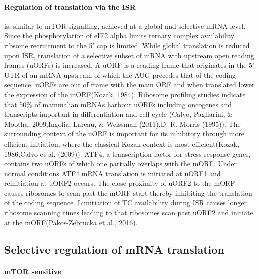 \documentclass[12pt,openany]{book}
\begin{document}
\paragraph{Regulation of translation via the ISR} is, similar to mTOR
signalling, achieved at a global and selective mRNA level. Since the
phosphorylation of eIF2 alpha limits ternary complex availability
ribsome recruitment to the 5' cap is limited. While global translation
is reduced upon ISR, translation of a selective subset of mRNA with
upstream open reading frames (uORFs) is increased. A uORF is a reading
frame that originates in the 5' UTR of an mRNA upstream of which the AUG
precedes that of the coding sequence. uORFs are out of frame with the
main ORF and when translated lower the expression of the mORF(Kozak,
1984). Ribosome profiling studies indicate that 50\% of mammalian mRNAs
harbour uORFs including oncogenes and transcripts important in
differentiation and cell cycle (Calvo, Pagliarini, \& Mootha,
2009,Ingolia, Lareau, \& Weissman (2011),D. R. Morris (1995)). The
surrounding context of the uORF is important for its inhibitory through
more efficient initiation, where the classical Kozak context is most
efficient(Kozak, 1986,Calvo et al. (2009)). ATF4, a transcription factor
for stress response genes, contains two uORFs of which one partially
overlaps with the mORF. Under normal conditions ATF4 mRNA translation is
initiated at uORF1 and reinitiation at uORF2 occurs. The close proximity
of uORF2 to the mORF causes ribosomes to scan past the mORF start
thereby inhibiting the translation of the coding sequence. Limitiation
of TC availability during ISR causes longer ribosome scanning times
leading to that ribosomes scan past uORF2 and initiate at the
mORF(Pakos-Zebrucka et al., 2016).

\subsection{Selective regulation of mRNA translation} \label{UTR}

\paragraph{mTOR sensitive}
\end{document}
